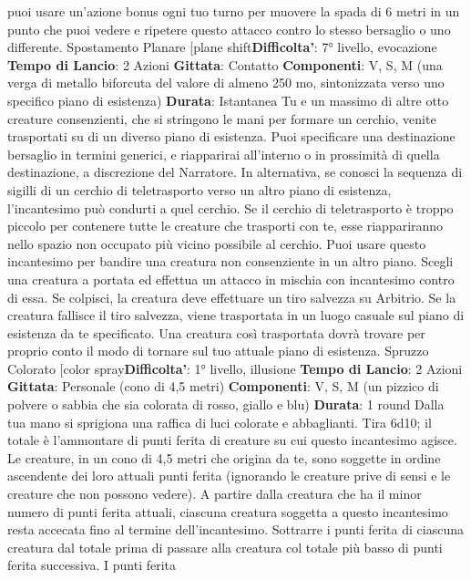 \begin{multicols}{2}
puoi usare un’azione bonus ogni tuo turno per muovere
la spada di 6 metri in un punto che puoi vedere e
ripetere questo attacco contro lo stesso bersaglio o uno
differente.
Spostamento Planare
[plane shift\textbf{Difficolta'}:
7° livello, evocazione
\textbf{Tempo di Lancio}: 2 Azioni
\textbf{Gittata}: Contatto
\textbf{Componenti}: V, S, M (una verga di metallo biforcuta
del valore di almeno 250 mo, sintonizzata verso uno
specifico piano di esistenza)
\textbf{Durata}: Istantanea
Tu e un massimo di altre otto creature consenzienti,
che si stringono le mani per formare un cerchio, venite
trasportati su di un diverso piano di esistenza. Puoi
specificare una destinazione bersaglio in termini
generici, e riapparirai all’interno o in prossimità di quella
destinazione, a discrezione del Narratore.
In alternativa, se conosci la sequenza di sigilli di un
cerchio di teletrasporto verso un altro piano di
esistenza, l’incantesimo può condurti a quel cerchio. Se
il cerchio di teletrasporto è troppo piccolo per contenere
tutte le creature che trasporti con te, esse riappariranno
nello spazio non occupato più vicino possibile al
cerchio.
Puoi usare questo incantesimo per bandire una
creatura non consenziente in un altro piano. Scegli una
creatura a portata ed effettua un attacco in mischia con
incantesimo contro di essa. Se colpisci, la creatura
deve effettuare un tiro salvezza su Arbitrio. Se la
creatura fallisce il tiro salvezza, viene trasportata in un
luogo casuale sul piano di esistenza da te specificato.
Una creatura così trasportata dovrà trovare per proprio
conto il modo di tornare sul tuo attuale piano di
esistenza.
Spruzzo Colorato
[color spray\textbf{Difficolta'}:
1° livello, illusione
\textbf{Tempo di Lancio}: 2 Azioni
\textbf{Gittata}: Personale (cono di 4,5 metri)
\textbf{Componenti}: V, S, M (un pizzico di polvere o sabbia
che sia colorata di rosso, giallo e blu)
\textbf{Durata}: 1 round
Dalla tua mano si sprigiona una raffica di luci colorate e
abbaglianti. Tira 6d10; il totale è l’ammontare di punti
ferita di creature su cui questo incantesimo agisce. Le
creature, in un cono di 4,5 metri che origina da te, sono
soggette in ordine ascendente dei loro attuali punti
ferita (ignorando le creature prive di sensi e le creature
che non possono vedere).
A partire dalla creatura che ha il minor numero di punti
ferita attuali, ciascuna creatura soggetta a questo
incantesimo resta accecata fino al termine
dell’incantesimo. Sottrarre i punti ferita di ciascuna
creatura dal totale prima di passare alla creatura col
totale più basso di punti ferita successiva. I punti ferita

\end{multicols}
